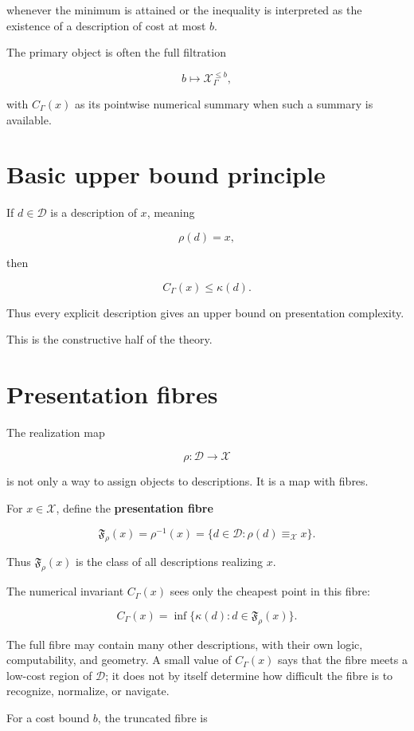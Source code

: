 \documentclass[11pt]{article}
\begin{document}
whenever the minimum is attained or the inequality is interpreted as the existence of a description of cost at most \(b\).

The primary object is often the full filtration

\[
b\mapsto \mathcal X_\Gamma^{\leq b},
\]

with \(C_\Gamma(x)\) as its pointwise numerical summary when such a summary is available.


\section{Basic upper bound principle}

If \(d\in\mathcal D\) is a description of \(x\), meaning

\[
\rho(d)=x,
\]

then

\[
C_\Gamma(x)\leq \kappa(d).
\]

Thus every explicit description gives an upper bound on presentation complexity.

This is the constructive half of the theory.


\section{Presentation fibres}

The realization map

\[
\rho:\mathcal D\to\mathcal X
\]

is not only a way to assign objects to descriptions. It is a map with fibres.

For \(x\in\mathcal X\), define the \textbf{presentation fibre}

\[
\mathfrak F_\rho(x)=\rho^{-1}(x)=\{d\in\mathcal D:\rho(d)\equiv_\mathcal X x\}.
\]

Thus \(\mathfrak F_\rho(x)\) is the class of all descriptions realizing \(x\).

The numerical invariant \(C_\Gamma(x)\) sees only the cheapest point in this fibre:

\[
C_\Gamma(x)=\inf\{\kappa(d):d\in\mathfrak F_\rho(x)\}.
\]

The full fibre may contain many other descriptions, with their own logic, computability, and geometry. A small value of \(C_\Gamma(x)\) says that the fibre meets a low-cost region of \(\mathcal D\); it does not by itself determine how difficult the fibre is to recognize, normalize, or navigate.

For a cost bound \(b\), the truncated fibre is
\end{document}
